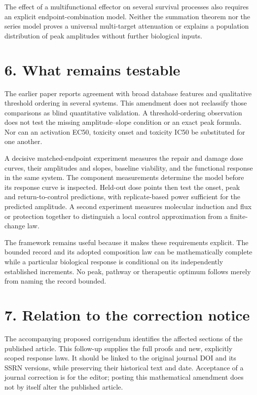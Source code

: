 \documentclass[
  11pt,
  a4paper,
]{article}
\begin{document}
The effect of a multifunctional effector on several survival processes also requires an explicit endpoint-combination model. Neither the summation theorem nor the series model proves a universal multi-target attenuation or explains a population distribution of peak amplitudes without further biological inputs.

\section{6. What remains testable}\label{what-remains-testable}

The earlier paper reports agreement with broad database features and qualitative threshold ordering in several systems. This amendment does not reclassify those comparisons as blind quantitative validation. A threshold-ordering observation does not test the missing amplitude--slope condition or an exact peak formula. Nor can an activation EC50, toxicity onset and toxicity IC50 be substituted for one another.

A decisive matched-endpoint experiment measures the repair and damage dose curves, their amplitudes and slopes, baseline viability, and the functional response in the same system. The component measurements determine the model before its response curve is inspected. Held-out dose points then test the onset, peak and return-to-control predictions, with replicate-based power sufficient for the predicted amplitude. A second experiment measures molecular induction and flux or protection together to distinguish a local control approximation from a finite-change law.

The framework remains useful because it makes these requirements explicit. The bounded record and its adopted composition law can be mathematically complete while a particular biological response is conditional on its independently established increments. No peak, pathway or therapeutic optimum follows merely from naming the record bounded.

\section{7. Relation to the correction notice}\label{relation-to-the-correction-notice}

The accompanying proposed corrigendum identifies the affected sections of the published article. This follow-up supplies the full proofs and new, explicitly scoped response laws. It should be linked to the original journal DOI and its SSRN versions, while preserving their historical text and date. Acceptance of a journal correction is for the editor; posting this mathematical amendment does not by itself alter the published article.
\end{document}
